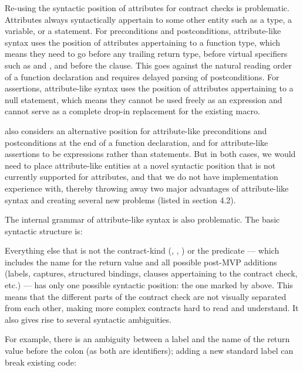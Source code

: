 Re-using the syntactic position of attributes for contract checks is problematic. Attributes always syntactically appertain to some other entity such as a type, a variable, or a statement. For preconditions and postconditions, attribute-like syntax uses the position of attributes appertaining to a function type, which means they need to go before any trailing return type, before virtual specifiers such as  and , and before the  clause. This goes against the natural reading order of a function declaration and requires delayed parsing of postconditions. For assertions, attribute-like syntax uses the position of attributes appertaining to a null statement, which means they cannot be used freely as an expression and cannot serve as a complete drop-in replacement for the existing  macro.

\cite{P2935R3} also considers an alternative position for attribute-like preconditions and postconditions at the end of a function declaration, and for attribute-like assertions to be expressions rather than statements. But in both cases, we would need to place attribute-like entities at a novel syntactic position that is not currently supported for attributes, and that we do not have implementation experience with, thereby throwing away two major advantages of attribute-like syntax and creating several new problems (listed in \cite{P2935R3} section 4.2).

The internal grammar of attribute-like syntax is also problematic. The basic syntactic structure is:

\phantom{~~~}

Everything else that is not the contract-kind (, , ) or the predicate --- which includes the name for the return value and all possible post-MVP additions (labels, captures, structured bindings,  clauses appertaining to the contract check, etc.) --- has only one possible syntactic position: the one marked by \tcode{***} above.  This means that the different parts of the contract check are not visually separated from each other, making more complex contracts hard to read and understand. It also gives rise to several syntactic ambiguities.

For example, there is an ambiguity between a label and the name of the return value before the colon (as both are identifiers); adding a new standard label can break existing code:

